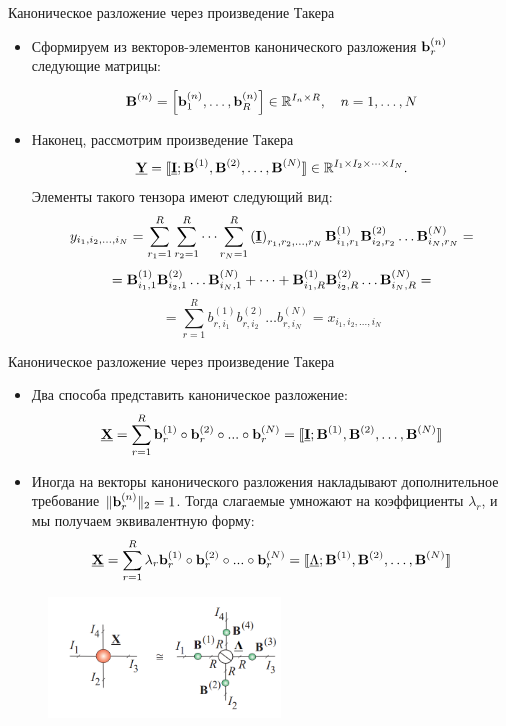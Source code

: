 
\begin{frame}{Каноническое разложение через произведение Такера}
\begin{itemize}
    \item Сформируем из векторов-элементов канонического разложения $\textbf{b}_r^{(n)}$ следующие матрицы:

    $$ \textbf{B}^{(n)} = \Big[ \textbf{b}_1^{(n)}, \dots, \textbf{b}_R^{(n)} \Big] \in \mathbb{R}^{I_n \times R}, \quad n = 1, \dots, N$$
    
    \item Наконец, рассмотрим произведение Такера $$\underline{\textbf{Y}} = \llbracket \underline{\textbf{I}}; \textbf{B}^{(1)}, \textbf{B}^{(2)}, \dots,  \textbf{B}^{(N)} \rrbracket \in \mathbb{R}^{I_1 \times I_2 \times \dots \times I_N}.$$ Элементы такого тензора имеют следующий вид:
    $$ y_{i_1, i_2, \dots, i_N} = \sum_{r_1=1}^R \sum_{r_2 = 1}^R \dots \sum_{r_N = 1}^R \left(\underline{\textbf{I}}\right)_{r_1, r_2, \dots, r_N} \textbf{B}^{(1)}_{i_1, r_1}\textbf{B}^{(2)}_{i_2, r_2} \dots \textbf{B}^{(N)}_{i_N, r_N} = $$ 
    $$= \textbf{B}^{(1)}_{i_1, 1}\textbf{B}^{(2)}_{i_2, 1} \dots \textbf{B}^{(N)}_{i_N, 1} +  \dots + \textbf{B}^{(1)}_{i_1, R}\textbf{B}^{(2)}_{i_2, R} \dots \textbf{B}^{(N)}_{i_N, R} = $$
    $$ = \sum_{r=1}^R b^{(1)}_{r, i_1} b^{(2)}_{r, i_2} \dots b^{(N)}_{r, i_N} = x_{i_1, i_2, ..., i_N}$$
\end{itemize}

\end{frame}

\begin{frame}{Каноническое разложение через произведение Такера}
\begin{itemize}
    \item Два способа представить каноническое разложение:
$$\underline{\textbf{X}} = \sum_{r=1}^R \textbf{b}_r^{(1)} \circ \textbf{b}_r^{(2)} \circ ... \circ \textbf{b}_r^{(N)} =  \llbracket \underline{\textbf{I}}; \textbf{B}^{(1)}, \textbf{B}^{(2)}, \dots,  \textbf{B}^{(N)} \rrbracket$$
    \item Иногда на векторы канонического разложения накладывают дополнительное требование $\lVert \textbf{b}_r^{(n)} \rVert_2 = 1$. Тогда слагаемые умножают на коэффициенты $\lambda_r$, и мы получаем эквивалентную форму:
    $$\underline{\textbf{X}} = \sum_{r=1}^R \lambda_r \textbf{b}_r^{(1)} \circ \textbf{b}_r^{(2)} \circ ... \circ \textbf{b}_r^{(N)} =  \llbracket \underline{\Lambda} ; \textbf{B}^{(1)}, \textbf{B}^{(2)}, \dots,  \textbf{B}^{(N)} \rrbracket$$
\end{itemize}

\begin{figure}
    \centering
    \includegraphics[width=0.55\textwidth]{lecture_11/figs/cp_decomp_2.png}
\end{figure}



\end{frame}






